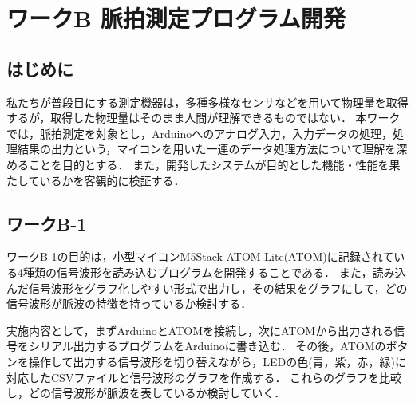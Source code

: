 \chapter{ワークB 脈拍測定プログラム開発}

\section{はじめに}
私たちが普段目にする測定機器は，多種多様なセンサなどを用いて物理量を取得するが，取得した物理量はそのまま人間が理解できるものではない．
本ワークでは，脈拍測定を対象とし，Arduinoへのアナログ入力，入力データの処理，処理結果の出力という，マイコンを用いた一連のデータ処理方法について理解を深めることを目的とする．
また，開発したシステムが目的とした機能・性能を果たしているかを客観的に検証する．

\section{ワークB-1}
ワークB-1の目的は，小型マイコンM5Stack ATOM Lite(ATOM)に記録されている4種類の信号波形を読み込むプログラムを開発することである．
また，読み込んだ信号波形をグラフ化しやすい形式で出力し，その結果をグラフにして，どの信号波形が脈波の特徴を持っているか検討する．

実施内容として，まずArduinoとATOMを接続し，次にATOMから出力される信号をシリアル出力するプログラムをArduinoに書き込む．
その後，ATOMのボタンを操作して出力する信号波形を切り替えながら，LEDの色(青，紫，赤，緑)に対応したCSVファイルと信号波形のグラフを作成する．
これらのグラフを比較し，どの信号波形が脈波を表しているか検討していく．

\newpage

